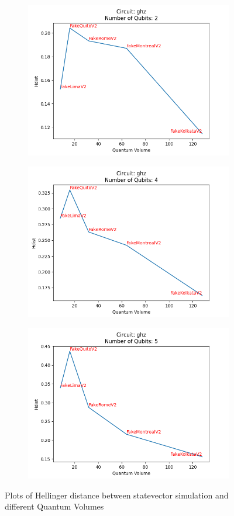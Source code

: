 \documentclass[11pt]{article}
\begin{document}
\begin{figure}[hbtp]
    \begin{subfigure}{0.5\linewidth}
        \centering
        \includegraphics[width=0.9\linewidth]{outputs/ghz_2.png}
    \end{subfigure}
    \begin{subfigure}{0.5\linewidth}
        \centering
        \includegraphics[width=0.9\linewidth]{outputs/ghz_4.png}
    \end{subfigure}
    \begin{subfigure}{\linewidth}
        \centering
        \includegraphics[width=0.45\linewidth]{outputs/ghz_5.png}
    \end{subfigure}
    \caption{Plots of Hellinger distance between statevector simulation and different Quantum Volumes}
    \label{fig:ghzplots}
\end{figure}
\end{document}
